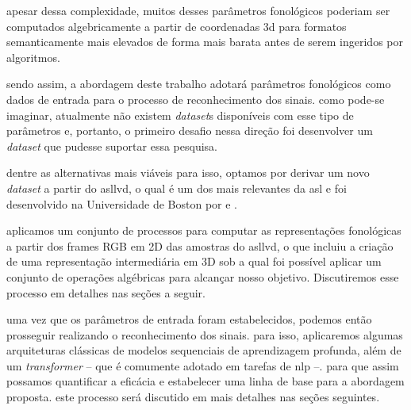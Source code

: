 apesar dessa complexidade, muitos desses parâmetros fonológicos poderiam ser computados algebricamente a partir de coordenadas 3d para formatos semanticamente mais elevados de forma mais barata antes de serem ingeridos por algoritmos.








sendo assim, a abordagem deste trabalho adotará parâmetros fonológicos como dados de entrada para o processo de reconhecimento dos sinais. como pode-se imaginar, atualmente não existem \textit{dataset}s disponíveis com esse tipo de parâmetros e, portanto, o primeiro desafio nessa direção foi desenvolver um \textit{dataset} que pudesse suportar essa pesquisa. 

dentre as alternativas mais viáveis para isso, optamos por derivar um novo \textit{dataset} a partir do \acrfull{asllvd}, o qual é um dos mais relevantes da \acrshort{asl} e foi desenvolvido na Universidade de Boston por  e . %

aplicamos um conjunto de processos para computar as representações fonológicas a partir dos frames RGB em 2D das amostras do \acrshort{asllvd}, o que incluiu a criação de uma representação intermediária em 3D sob a qual foi possível aplicar um conjunto de operações algébricas para alcançar nosso objetivo. Discutiremos esse processo em detalhes nas seções a seguir.




uma vez que os parâmetros de entrada foram estabelecidos, podemos então prosseguir realizando o reconhecimento dos sinais. para isso, aplicaremos algumas arquiteturas clássicas de modelos sequenciais de aprendizagem profunda, além de um \textit{transformer} -- que é comumente adotado em tarefas de \acrshort{nlp} --. para que assim possamos quantificar a eficácia e estabelecer uma linha de base para a abordagem proposta. este processo será discutido em mais detalhes nas seções seguintes.

